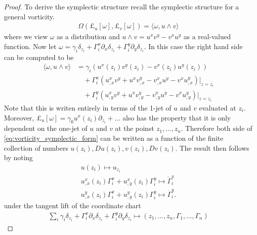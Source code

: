 \documentclass[12pt]{amsart}
\begin{document}
\begin{proof}
  To derive the symplectic structure recall the symplectic structure for a general vorticity.
  \begin{align}
    \Omega( \pounds_u[\omega] , \pounds_v[\omega] )
    = \langle \omega , u \wedge v \rangle \label{eq:vorticity_symplectic_form}
  \end{align}
  where we view $\omega$ as a distribution and $u \wedge v = u^x v^y - v^x u^y$
  as a real-valued function.
  Now let $\omega = \gamma_i \delta_{z_i} + \Gamma_i^x \partial_x\delta_{z_i} + \Gamma_i^y \partial_y \delta_{z_i}$.
  In this case the right hand side can be computed to be
  \begin{align*}
    \langle \omega , u \wedge v \rangle &= \gamma_i ( u^x(z_i)v^y(z_i) - v^x(z_i) u^y(z_i) ) \\
    &\quad + \Gamma_i^x ( u^x_{,x} v^y + u^x v^y_{,x} - v^x_{,x}u^y - v^x u^y_{,x})|_{z = z_i} \\
    &\quad + \Gamma_i^y ( u^x_{,y} v^y + u^x v^y_{,y} - v^x_{,y}u^y - v^x u^y_{,y})|_{z = z_i}
  \end{align*}
  Note that this is writen entirely in terms of the 1-jet of $u$ and $v$ evaluated 
  at $z_i$.
  Moreover, $\pounds_u[\omega] = \gamma_0 u^x(z_i) \partial_{z_i} + \dots$
  also has the property that it is only dependent on
  the one-jet of $u$ and $v$ at the poinst $z_1,\dots,z_n$.
  Therefore both side of \eqref{eq:vorticity_symplectic_form}
  can be written as a function of the finite collection of 
  numbers $u(z_i), Du(z_i), v(z_i),Dv(z_i)$.
  The result then follows by noting
  \begin{align*}
    u(z_i) \mapsto u_{z_i}\\
    u^x_{,x}(z_i) \Gamma^x_i + u^x_{,y}(z_i) \Gamma^y_i \mapsto \dot{\Gamma}_i^x \\
    u^y_{,x}(z_i) \Gamma^x_i + u^y_{,y}(z_i) \Gamma^y_i \mapsto \dot{\Gamma}_i^y.
    \end{align*}
    under the tangent lift of the coordinate chart
    \begin{align*}
      \sum_i \gamma_i \delta_{z_i} + \Gamma_i^x \partial_x \delta_{z_i} + \Gamma_i^y \partial_y \delta_{z_i} \mapsto (z_1,\dots,z_n,\Gamma_1,\dots,\Gamma_n)
      \end{align*}
\end{proof}
\end{document}
